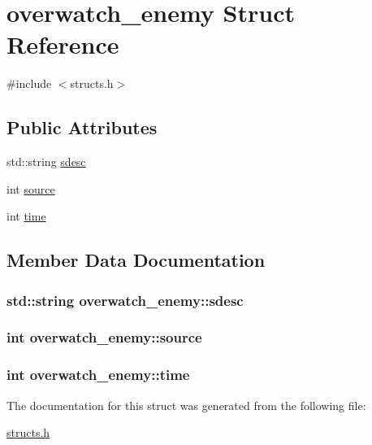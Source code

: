 \hypertarget{structoverwatch__enemy}{\section{overwatch\-\_\-enemy Struct Reference}
\label{structoverwatch__enemy}
}


{\ttfamily \#include $<$structs.\-h$>$}

\subsection*{Public Attributes}
\begin{DoxyCompactItemize}
\item 
std\-::string \hyperlink{structoverwatch__enemy_a6b56a0e4b9e94f5deb415e210f5aab68}{sdesc}
\item 
int \hyperlink{structoverwatch__enemy_aba2d74736f768cd239a410b671042fa8}{source}
\item 
int \hyperlink{structoverwatch__enemy_aa251cd972dd125d8f130b3b7f03dbd69}{time}
\end{DoxyCompactItemize}


\subsection{Member Data Documentation}
\hypertarget{structoverwatch__enemy_a6b56a0e4b9e94f5deb415e210f5aab68}{
\subsubsection[{sdesc}]{\setlength{\rightskip}{0pt plus 5cm}std\-::string overwatch\-\_\-enemy\-::sdesc}}\label{structoverwatch__enemy_a6b56a0e4b9e94f5deb415e210f5aab68}
\hypertarget{structoverwatch__enemy_aba2d74736f768cd239a410b671042fa8}{
\subsubsection[{source}]{\setlength{\rightskip}{0pt plus 5cm}int overwatch\-\_\-enemy\-::source}}\label{structoverwatch__enemy_aba2d74736f768cd239a410b671042fa8}
\hypertarget{structoverwatch__enemy_aa251cd972dd125d8f130b3b7f03dbd69}{
\subsubsection[{time}]{\setlength{\rightskip}{0pt plus 5cm}int overwatch\-\_\-enemy\-::time}}\label{structoverwatch__enemy_aa251cd972dd125d8f130b3b7f03dbd69}


The documentation for this struct was generated from the following file\-:\begin{DoxyCompactItemize}
\item 
\hyperlink{structs_8h}{structs.\-h}\end{DoxyCompactItemize}
